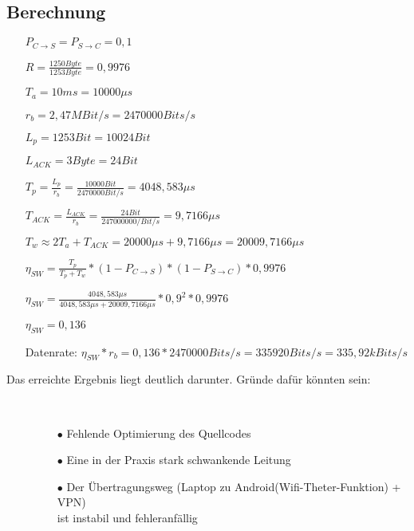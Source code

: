 \documentclass[12pt]{article}
\begin{document}
\subsection{Berechnung}
    \begin{itemize}
        \item[] \(P_{C\rightarrow S} = P_{S\rightarrow C} = 0,1\)
        \item[] \(R = \frac{1250Byte}{1253Byte} = 0,9976\) 
        \item[] \(T_a = 10ms = 10000\mu s\)
        \item[] \(r_b = 2,47MBit/s = 2470000Bits/s\)
        \item[] \(L_p = 1253Bit = 10024Bit\)
        \item[] \(L_{ACK} = 3Byte = 24Bit\)
        \item[] \(T_p = \frac{L_p}{r_b} = \frac{10000Bit}{2470000Bit/s} = 4048,583\mu s\)
        \item[] \(T_{ACK} = \frac{L_{ACK}}{r_b} = \frac{24Bit}{247000000/Bit/s} = 9,7166\mu s\)
        \item[] \(T_w \approx 2T_a + T_{ACK} = 20000\mu s + 9,7166\mu s = 20009,7166\mu s\) 
        \item[] \(\eta_{SW} = \frac{T_p}{T_p + T_w}*(1-P_{C\rightarrow S})*(1-P_{S\rightarrow C})*0,9976\) 
        \item[] \(\eta_{SW} = \frac{4048,583\mu s}{4048,583\mu s + 20009,7166\mu s}*0,9^2*0,9976\) 
        \item[] \(\eta_{SW} = 0,136 \)
        \item[]  Datenrate: \(\eta_{SW} * r_b = 0,136 * 2470000Bits/s = 335920Bits/s = 335,92kBits/s\)
    \end{itemize}
\begin{description}
\item[Das erreichte Ergebnis liegt deutlich darunter. Gründe dafür könnten sein:]~\par
\begin{enumerate}
    \item[$\bullet$] Fehlende Optimierung des Quellcodes
    \item[$\bullet$] Eine in der Praxis stark schwankende Leitung
    \item[$\bullet$] Der Übertragungsweg (Laptop zu Android(Wifi-Theter-Funktion) + VPN)\\
    ist instabil und fehleranfällig
\end{enumerate}

\end{description}
\end{document}
